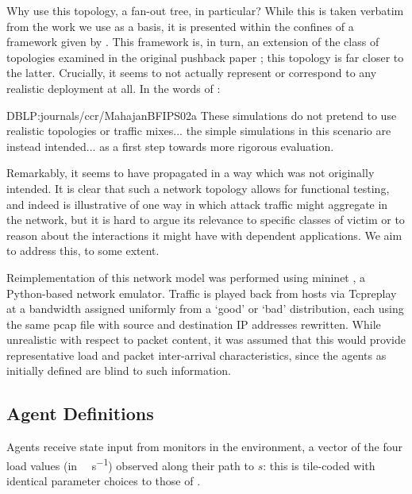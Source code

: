 \documentclass[conference, letterpaper, 10pt, times]{IEEEtran}
\begin{document}
Why use this topology, a fan-out tree, in particular?
While this is taken verbatim from the work we use as a basis, it is presented within the confines of a framework given by \textcite{DBLP:journals/ton/YauLLY05}.
This framework is, in turn, an extension of the class of topologies examined in the original pushback paper \cite{DBLP:journals/ccr/MahajanBFIPS02a}; this topology is far closer to the latter.
Crucially, it seems to not actually represent or correspond to any realistic deployment at all.
In the words of \citeauthor{DBLP:journals/ccr/MahajanBFIPS02a}:
\begin{displaycquote}{DBLP:journals/ccr/MahajanBFIPS02a}
	These simulations do not pretend to use realistic topologies or traffic mixes... the simple simulations in this scenario are instead intended... as a first step towards more rigorous evaluation.
\end{displaycquote}
Remarkably, it seems to have propagated in a way which was not originally intended.
It is clear that such a network topology allows for functional testing, and indeed is illustrative of one way in which attack traffic might aggregate in the network, but it is hard to argue its relevance to specific classes of victim or to reason about the interactions it might have with dependent applications.
We aim to address this, to some extent.

Reimplementation of this network model was performed using mininet \cite{mininet}, a Python-based network emulator.
Traffic is played back from hosts via Tcpreplay at a bandwidth assigned uniformly from a `good' or `bad' distribution, each using the same pcap file with source and destination IP addresses rewritten.
While unrealistic with respect to packet content, it was assumed that this would provide representative load and packet inter-arrival characteristics, since the agents as initially defined are blind to such information.

\subsection{Agent Definitions}

Agents receive state input from monitors in the environment, a vector of the four load values (in \si{\mega\bit\per\second}) observed along their path to $s$: this is tile-coded with identical parameter choices to those of \textcite{DBLP:phd/ethos/Malialis14}.
\end{document}
